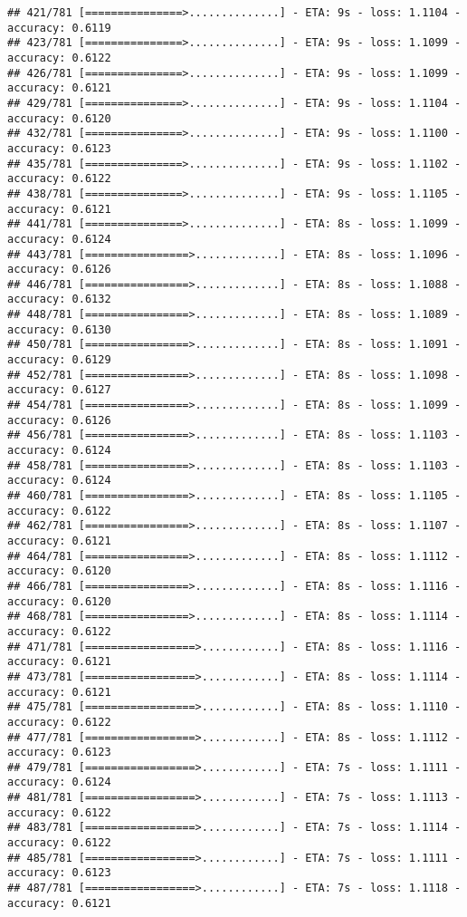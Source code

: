 \documentclass[
]{article}
\begin{document}
\begin{verbatim}
## 421/781 [===============>..............] - ETA: 9s - loss: 1.1104 - accuracy: 0.6119
## 423/781 [===============>..............] - ETA: 9s - loss: 1.1099 - accuracy: 0.6122
## 426/781 [===============>..............] - ETA: 9s - loss: 1.1099 - accuracy: 0.6121
## 429/781 [===============>..............] - ETA: 9s - loss: 1.1104 - accuracy: 0.6120
## 432/781 [===============>..............] - ETA: 9s - loss: 1.1100 - accuracy: 0.6123
## 435/781 [===============>..............] - ETA: 9s - loss: 1.1102 - accuracy: 0.6122
## 438/781 [===============>..............] - ETA: 9s - loss: 1.1105 - accuracy: 0.6121
## 441/781 [===============>..............] - ETA: 8s - loss: 1.1099 - accuracy: 0.6124
## 443/781 [================>.............] - ETA: 8s - loss: 1.1096 - accuracy: 0.6126
## 446/781 [================>.............] - ETA: 8s - loss: 1.1088 - accuracy: 0.6132
## 448/781 [================>.............] - ETA: 8s - loss: 1.1089 - accuracy: 0.6130
## 450/781 [================>.............] - ETA: 8s - loss: 1.1091 - accuracy: 0.6129
## 452/781 [================>.............] - ETA: 8s - loss: 1.1098 - accuracy: 0.6127
## 454/781 [================>.............] - ETA: 8s - loss: 1.1099 - accuracy: 0.6126
## 456/781 [================>.............] - ETA: 8s - loss: 1.1103 - accuracy: 0.6124
## 458/781 [================>.............] - ETA: 8s - loss: 1.1103 - accuracy: 0.6124
## 460/781 [================>.............] - ETA: 8s - loss: 1.1105 - accuracy: 0.6122
## 462/781 [================>.............] - ETA: 8s - loss: 1.1107 - accuracy: 0.6121
## 464/781 [================>.............] - ETA: 8s - loss: 1.1112 - accuracy: 0.6120
## 466/781 [================>.............] - ETA: 8s - loss: 1.1116 - accuracy: 0.6120
## 468/781 [================>.............] - ETA: 8s - loss: 1.1114 - accuracy: 0.6122
## 471/781 [=================>............] - ETA: 8s - loss: 1.1116 - accuracy: 0.6121
## 473/781 [=================>............] - ETA: 8s - loss: 1.1114 - accuracy: 0.6121
## 475/781 [=================>............] - ETA: 8s - loss: 1.1110 - accuracy: 0.6122
## 477/781 [=================>............] - ETA: 8s - loss: 1.1112 - accuracy: 0.6123
## 479/781 [=================>............] - ETA: 7s - loss: 1.1111 - accuracy: 0.6124
## 481/781 [=================>............] - ETA: 7s - loss: 1.1113 - accuracy: 0.6122
## 483/781 [=================>............] - ETA: 7s - loss: 1.1114 - accuracy: 0.6122
## 485/781 [=================>............] - ETA: 7s - loss: 1.1111 - accuracy: 0.6123
## 487/781 [=================>............] - ETA: 7s - loss: 1.1118 - accuracy: 0.6121

\end{verbatim}
\end{document}
